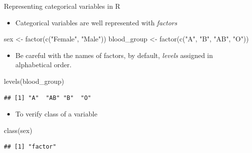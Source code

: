 \documentclass[
  ignorenonframetext,
]{beamer}
\newenvironment{Shaded}{\begin{snugshade}}{\end{snugshade}}
\newcommand{\FunctionTok}[1]{\textcolor[rgb]{0.00,0.00,0.00}{#1}}
\newcommand{\NormalTok}[1]{#1}
\newcommand{\OtherTok}[1]{\textcolor[rgb]{0.56,0.35,0.01}{#1}}
\newcommand{\StringTok}[1]{\textcolor[rgb]{0.31,0.60,0.02}{#1}}
\providecommand{\tightlist}{%
  \setlength{\itemsep}{0pt}\setlength{\parskip}{0pt}}
\begin{document}
\begin{frame}[fragile]{Representing categorical variables in R}
\protect\hypertarget{representing-categorical-variables-in-r}{}
\begin{itemize}
\tightlist
\item
  Categorical variables are well represented with \emph{factors}
\end{itemize}

\begin{Shaded}
\begin{Highlighting}[]
\NormalTok{sex }\OtherTok{\textless{}{-}} \FunctionTok{factor}\NormalTok{(}\FunctionTok{c}\NormalTok{(}\StringTok{"Female"}\NormalTok{, }\StringTok{"Male"}\NormalTok{))}
\NormalTok{blood\_group }\OtherTok{\textless{}{-}} \FunctionTok{factor}\NormalTok{(}\FunctionTok{c}\NormalTok{(}\StringTok{"A"}\NormalTok{, }\StringTok{"B"}\NormalTok{, }\StringTok{"AB"}\NormalTok{, }\StringTok{"O"}\NormalTok{))}
\end{Highlighting}
\end{Shaded}

\begin{itemize}
\tightlist
\item
  Be careful with the names of factors, by default, \emph{levels}
  assigned in alphabetical order.
\end{itemize}

\begin{Shaded}
\begin{Highlighting}[]
\FunctionTok{levels}\NormalTok{(blood\_group)}
\end{Highlighting}
\end{Shaded}

\begin{verbatim}
## [1] "A"  "AB" "B"  "O"
\end{verbatim}

\begin{itemize}
\tightlist
\item
  To verify class of a variable
\end{itemize}

\begin{Shaded}
\begin{Highlighting}[]
\FunctionTok{class}\NormalTok{(sex)}
\end{Highlighting}
\end{Shaded}

\begin{verbatim}
## [1] "factor"
\end{verbatim}
\end{frame}
\end{document}

